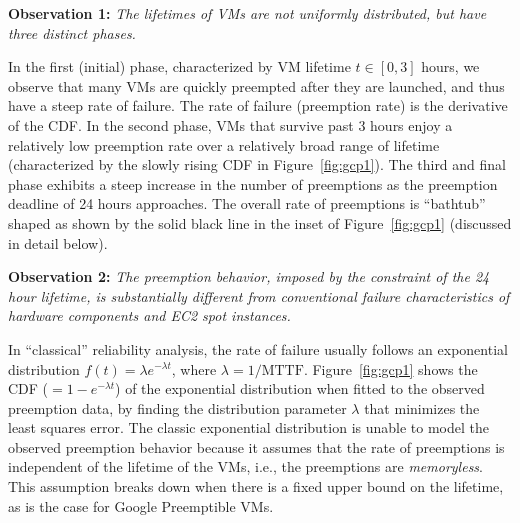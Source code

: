 \noindent \textbf{Observation 1:} \emph{The lifetimes of VMs are not uniformly distributed, but have three distinct phases.}

\noindent In the first (initial) phase, characterized by VM lifetime $t\in [0, 3]$ hours, we observe that many VMs are quickly preempted after they are launched, and thus have a steep rate of failure. The rate of failure (preemption rate) is the derivative of the CDF.
In the second phase, VMs that survive past 3 hours enjoy a relatively low preemption rate over a relatively broad range of lifetime (characterized by the slowly rising CDF in Figure~\ref{fig:gcp1}).
The third and final phase exhibits a steep increase in the number of preemptions as the preemption deadline of 24 hours approaches.
The overall rate of preemptions is ``bathtub'' shaped as shown by the solid black line in the inset of Figure~\ref{fig:gcp1} (discussed in detail below).



\noindent \textbf{Observation 2:} \emph{The preemption behavior, imposed by the constraint of the 24 hour lifetime, is substantially different from conventional failure characteristics of hardware components and EC2 spot instances.}

\noindent In ``classical'' reliability analysis, the rate of failure  usually follows an exponential distribution $f(t) = \lambda e^{-\lambda t}$, where $\lambda=1/\text{MTTF}$.
Figure~\ref{fig:gcp1} shows the CDF ($=1-e^{-\lambda t}$) of the exponential distribution when fitted to the observed preemption data, by finding the distribution parameter $\lambda$ that minimizes the least squares error.
The classic exponential distribution is unable to model the observed preemption behavior because it assumes that the rate of preemptions is independent of the lifetime of the VMs, i.e., the preemptions are \emph{memoryless}.
This assumption breaks down when there is a fixed upper bound on the lifetime, as is the case for Google Preemptible VMs.%

